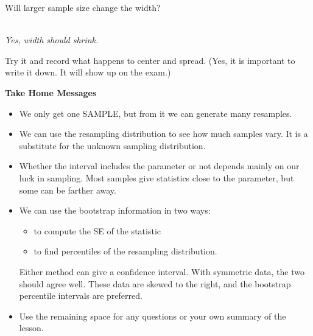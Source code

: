 \begin{enumerate}
   Will larger sample size  change the width?\\
\begin{students}
        \vspace{.5cm}        
\end{students}
\begin{key}
\\ {\it Yes, width should shrink.}
\end{key}

   Try it and record what happens to center and spread.  (Yes, it is
   important to write it down. It will show up on the exam.)
   \vspace{4cm}
\end{enumerate}

\begin{center}
  {\bf Take Home Messages}
\end{center}
\begin{itemize}
  \item   We only get one SAMPLE, but from it we can generate many
    resamples.
  \item We can use the resampling distribution to see how much
    samples vary. It is a substitute for the unknown sampling
    distribution.
  \item Whether the interval includes the parameter or not
    depends mainly on our luck in sampling.  Most samples give statistics
    close to the parameter, but some can be farther away.
  \item We can use the bootstrap information in two ways:
    \begin{itemize}
    \item to compute the SE of the statistic
    \item to find percentiles of the resampling distribution.
    \end{itemize}
   Either method can give a confidence interval.  With symmetric data, the
   two should agree well.  These data are skewed to the right, and the
   bootstrap percentile intervals are preferred.
 \item 
  Use the remaining space for any questions or your own summary of the
  lesson. 
  \end{itemize}
  